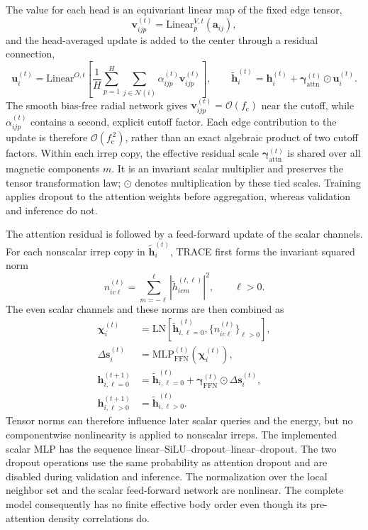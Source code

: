 \documentclass[aps,prx,preprint,notitlepage,superscriptaddress,nofootinbib,floatfix]{revtex4-2}
\newcommand{\calN}{\mathcal{N}}
\newcommand{\vect}[1]{\bm{#1}}
\newif\ifshowrevisions
\newcommand{\draftthirtytwo}[1]{%
  \ifshowrevisions\textcolor{draftthirtytwocolor}{#1}\else#1\fi}
\begin{document}
The value for each head is an equivariant linear map of the
fixed edge tensor,
\begin{equation}
 \vect v^{(t)}_{ijp}=\mathrm{Linear}^{V,t}_{p}(\vect a_{ij}),
 \label{eq:value}
\end{equation}
and the head-averaged update is added to the center through a
residual connection,
\begin{equation}
 \vect u^{(t)}_i=
 \mathrm{Linear}^{O,t}\!\left[
 \frac{1}{H}\sum_{p=1}^{H}\sum_{j\in\calN(i)}
 \alpha^{(t)}_{ijp}\vect v^{(t)}_{ijp}\right],
 \qquad
\widetilde{\vect h}_i^{(t)}=
 \vect h_i^{(t)}+\vect\gamma^{(t)}_{\mathrm{attn}}\odot\vect u^{(t)}_i.
 \label{eq:attention-update}
\end{equation}
\draftthirtytwo{The smooth bias-free radial network gives
$\vect v_{ijp}^{(t)}=\mathcal O(f_{\mathrm c})$ near the cutoff, while
$\alpha_{ijp}^{(t)}$ contains a second, explicit cutoff factor. Each edge
contribution to the update is therefore
$\mathcal O(f_{\mathrm c}^{\,2})$, rather than an exact algebraic product of
two cutoff factors. Within each irrep copy, the effective residual scale
$\vect\gamma^{(t)}_{\mathrm{attn}}$ is shared over all magnetic components
$m$. It is an invariant scalar multiplier and preserves the tensor
transformation law; $\odot$ denotes multiplication by these tied scales.
Training applies dropout to the attention weights before aggregation, whereas
validation and inference do not.}

The attention residual is followed by a feed-forward update
of the scalar channels. For each nonscalar irrep copy in
$\widetilde{\vect h}_i^{(t)}$, TRACE first forms the invariant squared norm
\begin{equation}
 n^{(t)}_{ic\ell}=\sum_{m=-\ell}^{\ell}
 \left|\widetilde h^{(t,\ell)}_{icm}\right|^2,
 \qquad \ell>0.
 \label{eq:norm}
\end{equation}
The even scalar channels and these norms are then combined as
\begin{align}
 \vect\chi_i^{(t)}&=\mathrm{LN}\!\left[
 \widetilde{\vect h}^{(t)}_{i,\ell=0},
 \{n^{(t)}_{ic\ell}\}_{\ell>0}\right],\\
 \Delta\vect s_i^{(t)}&=\mathrm{MLP}^{(t)}_{\mathrm{FFN}}
 \!\left(\vect\chi_i^{(t)}\right),\\
 \vect h^{(t+1)}_{i,\ell=0}&=
 \widetilde{\vect h}^{(t)}_{i,\ell=0}
 +\vect\gamma^{(t)}_{\mathrm{FFN}}\odot\Delta\vect s_i^{(t)},\\
 \vect h^{(t+1)}_{i,\ell>0}&=
 \widetilde{\vect h}^{(t)}_{i,\ell>0}.
 \label{eq:scalar-ffn}
\end{align}
Tensor norms can therefore influence later scalar queries and
the energy, but no componentwise nonlinearity is applied to nonscalar irreps.
\draftthirtytwo{The implemented scalar MLP has the sequence
linear--SiLU--dropout--linear--dropout. The two dropout operations use the
same probability as attention dropout and are disabled during validation and
inference.}
The normalization over the local neighbor set and the scalar feed-forward
network are nonlinear. The complete model consequently has no finite effective
body order even though its pre-attention density correlations do.
\end{document}
